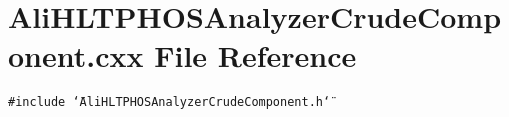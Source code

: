 \section{Ali\-HLTPHOSAnalyzer\-Crude\-Component.cxx File Reference}
\label{AliHLTPHOSAnalyzerCrudeComponent_8cxx}
{\tt \#include \char`\"{}Ali\-HLTPHOSAnalyzer\-Crude\-Component.h\char`\"{}}\par
